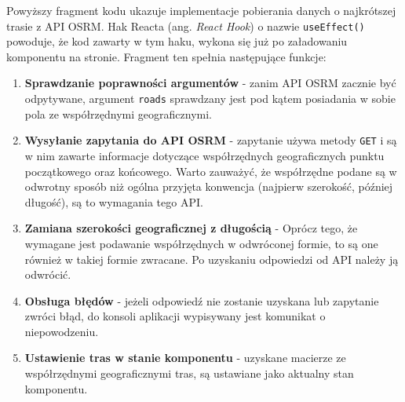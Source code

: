   Powyższy fragment kodu ukazuje implementacje pobierania danych o najkrótszej trasie z API OSRM. Hak Reacta (ang. \emph{React Hook}) o nazwie \texttt{useEffect()} powoduje, że kod zawarty w tym haku, wykona się już po załadowaniu komponentu na stronie. Fragment ten spełnia następujące funkcje:
  \begin{enumerate}
    \item \textbf{Sprawdzanie poprawności argumentów} - zanim API OSRM zacznie być odpytywane, argument \texttt{roads} sprawdzany jest pod kątem posiadania w sobie pola ze współrzędnymi geograficznymi.
    \item \textbf{Wysyłanie zapytania do API OSRM} - zapytanie używa metody \texttt{GET} i są w nim zawarte informacje dotyczące współrzędnych geograficznych punktu początkowego oraz końcowego. Warto zauważyć, że współrzędne podane są w odwrotny sposób niż ogólna przyjęta konwencja (najpierw szerokość, później długość), są to wymagania tego API.
    \item \textbf{Zamiana szerokości geograficznej z długością} - Oprócz tego, że wymagane jest podawanie współrzędnych w odwróconej formie, to są one również w takiej formie zwracane. Po uzyskaniu odpowiedzi od API należy ją odwrócić.
    \item \textbf{Obsługa błędów} - jeżeli odpowiedź nie zostanie uzyskana lub zapytanie zwróci błąd, do konsoli aplikacji wypisywany jest komunikat o niepowodzeniu.
    \item \textbf{Ustawienie tras w stanie komponentu} - uzyskane macierze ze współrzędnymi geograficznymi tras, są ustawiane jako aktualny stan komponentu.
  \end{enumerate}
  
